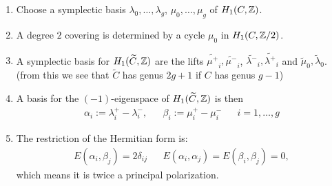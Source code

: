 \begin{frame}

\begin{enumerate}
	\item Choose a symplectic basis $\lambda_0, \ldots, \lambda_g$, $\mu_0, \ldots, \mu_g$ of $H_1(C,\mathbb{Z})$.
	\pause
	\item A degree $2$ covering is determined by a cycle $\mu_0$ in $H_1(C, \mathbb{Z}/2)$.
	\pause
	\item A symplectic basis for $H_1(\widetilde C, \mathbb{Z})$ are the lifts $\widetilde{\mu^+}_i, \widetilde{\mu^-}_i$, $\widetilde{\lambda^-}_i, \widetilde{\lambda^+}_i$ and $\widetilde{\mu}_0, \widetilde{\lambda}_0$. (from this we see that $\widetilde C$ has genus $2g+1$ if $C$ has genus $g-1$)
	\pause
	\item A basis for the $(-1)$-eigenspace of $H_1(\widetilde C,\mathbb{Z})$ is then
	\begin{align*}
	\alpha_i := \lambda_i^+ - \lambda_i^-, && \beta_i := \mu_i^+ - \mu_i^- && i=1,\ldots, g
	\end{align*}
	\pause
	\item The restriction of the Hermitian form is:
	\begin{align*}
	E(\alpha_i,\beta_j)= 2 \delta_{ij} && E(\alpha_i, \alpha_j) = E(\beta_i,\beta_j)=0,
	\end{align*}
	which means it is twice a principal polarization.
\end{enumerate}


\end{frame}